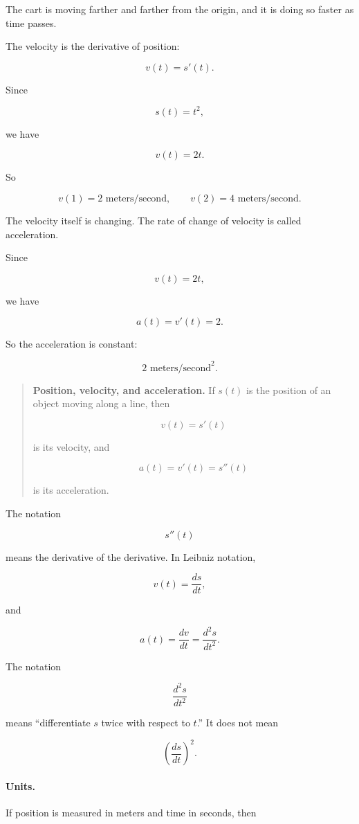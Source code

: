 The cart is moving farther and farther from the origin, and it is doing so faster as time passes.

The velocity is the derivative of position:

\[
v(t)=s'(t).
\]

Since

\[
s(t)=t^2,
\]

we have

\[
v(t)=2t.
\]

So

\[
v(1)=2\text{ meters/second},
\qquad
v(2)=4\text{ meters/second}.
\]

The velocity itself is changing.  The rate of change of velocity is called acceleration.

Since

\[
v(t)=2t,
\]

we have

\[
a(t)=v'(t)=2.
\]

So the acceleration is constant:

\[
2\text{ meters/second}^2.
\]

\begin{quote}
\textbf{Position, velocity, and acceleration.}
If \(s(t)\) is the position of an object moving along a line, then

\[
\boxed{v(t)=s'(t)}
\]

is its velocity, and

\[
\boxed{a(t)=v'(t)=s''(t)}
\]

is its acceleration.
\end{quote}

The notation

\[
s''(t)
\]

means the derivative of the derivative.  In Leibniz notation,

\[
v(t)=\frac{ds}{dt},
\]

and

\[
a(t)=\frac{dv}{dt}=\frac{d^2s}{dt^2}.
\]

The notation

\[
\frac{d^2s}{dt^2}
\]

means ``differentiate \(s\) twice with respect to \(t\).''  It does not mean

\[
\left(\frac{ds}{dt}\right)^2.
\]

\paragraph{Units.}
If position is measured in meters and time in seconds, then

